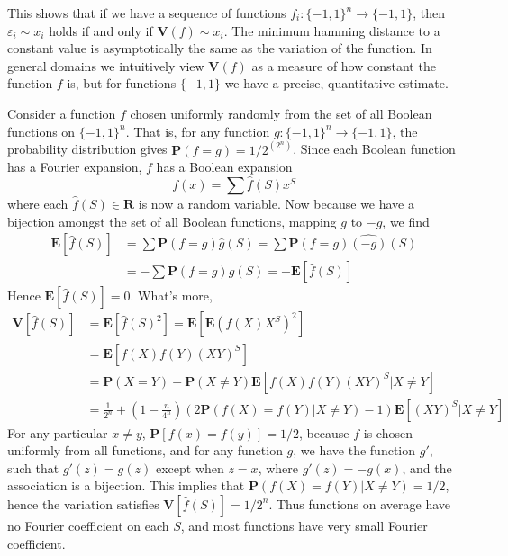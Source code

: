 This shows that if we have a sequence of functions $f_i: \{ -1, 1 \}^n \to \{ -1, 1 \}$, then $\varepsilon_i \sim x_i$ holds if and only if $\mathbf{V}(f) \sim x_i$. The minimum hamming distance to a constant value is asymptotically the same as the variation of the function. In general domains we intuitively view $\mathbf{V}(f)$ as a measure of how constant the function $f$ is, but for functions $\{ -1, 1 \}$ we have a precise, quantitative estimate.

\begin{example}
    Consider a function $f$ chosen uniformly randomly from the set of all Boolean functions on $\{ -1, 1 \}^n$. That is, for any function $g: \{ -1, 1 \}^n \to \{ -1, 1 \}$, the probability distribution gives $\mathbf{P}(f = g) = 1/2^{(2^n)}$. Since each Boolean function has a Fourier expansion, $f$ has a Boolean expansion
    \[ f(x) = \sum \widehat{f}(S) x^S \]
    where each $\widehat{f}(S) \in \mathbf{R}$ is now a random variable. Now because we have a bijection amongst the set of all Boolean functions, mapping $g$ to $-g$, we find
    \begin{align*}
        \mathbf{E}[\widehat{f}(S)] &= \sum \mathbf{P}(f = g) \widehat{g}(S) = \sum \mathbf{P}(f = g) \widehat{(-g)}(S)\\
        &= - \sum \mathbf{P}(f = g) \widehat{g}(S) = -\mathbf{E}[\widehat{f}(S)]
    \end{align*}
    Hence $\mathbf{E}[\widehat{f}(S)] = 0$. What's more,
    \begin{align*}
        \mathbf{V}[\widehat{f}(S)] &= \mathbf{E}[\widehat{f}(S)^2] = \mathbf{E} \left[ \mathbf{E} \left( f(X) X^S \right)^2 \right]\\
        &= \mathbf{E}[f(X) f(Y) (XY)^S]\\
        &= \mathbf{P}(X = Y) + \mathbf{P}(X \neq Y) \mathbf{E}[f(X) f(Y) (XY)^S | X \neq Y]\\
        &= \frac{1}{2^n} + \left( 1 - \frac{n}{4^n} \right) \left( 2\mathbf{P}(f(X) = f(Y) | X \neq Y) - 1 \right) \mathbf{E}[(XY)^S | X \neq Y]
    \end{align*}
    For any particular $x \neq y$, $\mathbf{P}[f(x) = f(y)] = 1/2$, because $f$ is chosen uniformly from all functions, and for any function $g$, we have the function $g'$, such that $g'(z) = g(z)$ except when $z = x$, where $g'(z) = -g(x)$, and the association is a bijection. This implies that $\mathbf{P}(f(X) = f(Y) | X \neq Y) = 1/2$, hence the variation satisfies $\mathbf{V}[\widehat{f}(S)] = 1/2^n$. Thus functions on average have no Fourier coefficient on each $S$, and most functions have very small Fourier coefficient.
\end{example}


